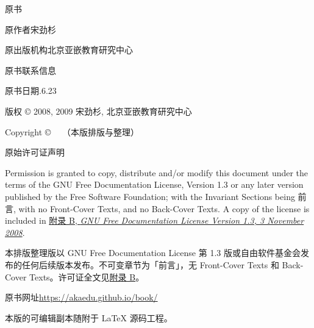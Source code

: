\noindent 原书\quad \OriginalTitle\par
\noindent 原作者\quad 宋劲杉\par
\noindent 原出版机构\quad 北京亚嵌教育研究中心\par
\noindent 原书联系信息\quad {}\par
\noindent 原书日期.\BookSplit{}6.\BookSplit{}23\par

版权 © 2008, 2009 宋劲杉, 北京亚嵌教育研究中心

Copyright © \EditionYear\ \EditionRightsHolder\ （本版排版与整理）\par
\medskip\noindent 原始许可证声明\par
{}

Permission is granted to copy, distribute and/\BookSplit{}or modify this document under the terms of the GNU Free Documentation License, Version 1.\BookSplit{}3 or any later version published by the Free Software Foundation; with the Invariant Sections being 前言, with no Front-Cover Texts, and no Back-Cover Texts.\BookSplit{} A copy of the license is included in \hyperlink{db.apb.id2907828}{附录 B, \emph{GNU Free Documentation License Version 1.\BookSplit{}3, 3 November 2008}}.


本排版整理版以 GNU Free Documentation License 第 1.3 版或自由软件基金会发布的任何后续版本发布。不可变章节为「前言」，无 Front-Cover Texts 和 Back-Cover Texts。许可证全文见\hyperlink{db.apb}{附录 B}。


原书网址\quad\url{https://akaedu.github.io/book/}


本版的可编辑副本随附于 \LaTeX{} 源码工程。
